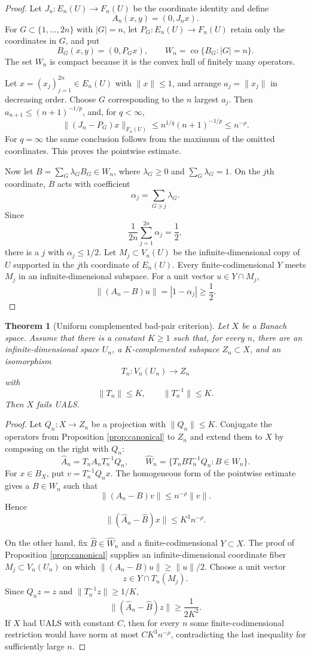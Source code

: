 \documentclass[11pt]{article}
\newtheorem{theorem}{Theorem}[section]
\theoremstyle{definition}
\theoremstyle{remark}
\newcommand{\co}{\operatorname{co}}
\begin{document}
\begin{proof}
Let $J_n:E_n(U)\to F_n(U)$ be the coordinate identity and define
\[
  A_n(x,y)=(0,J_nx).
\]
For $G\subset\{1,\dots,2n\}$ with $|G|=n$, let $P_G:E_n(U)\to F_n(U)$ retain only the coordinates in $G$, and put
\[
  B_G(x,y)=(0,P_Gx),
  \qquad
  W_n=\co\{B_G:|G|=n\}.
\]
The set $W_n$ is compact because it is the convex hull of finitely many operators.

Let $x=(x_j)_{j=1}^{2n}\in E_n(U)$ with $\|x\|\leq1$, and arrange $a_j=\|x_j\|$ in decreasing order.  Choose $G$ corresponding to the $n$ largest $a_j$.  Then $a_{n+1}\leq(n+1)^{-1/p}$, and, for $q<\infty$,
\[
  \|(J_n-P_G)x\|_{F_n(U)}
  \leq n^{1/q}(n+1)^{-1/p}
  \leq n^{-\rho}.
\]
For $q=\infty$ the same conclusion follows from the maximum of the omitted coordinates.  This proves the pointwise estimate.

Now let $B=\sum_G\lambda_GB_G\in W_n$, where $\lambda_G\geq0$ and $\sum_G\lambda_G=1$.  On the $j$th coordinate, $B$ acts with coefficient
\[
  \alpha_j=\sum_{G\ni j}\lambda_G.
\]
Since
\[
  \frac1{2n}\sum_{j=1}^{2n}\alpha_j=\frac12,
\]
there is a $j$ with $\alpha_j\leq1/2$.  Let $M_j\subset V_n(U)$ be the infinite-dimensional copy of $U$ supported in the $j$th coordinate of $E_n(U)$.  Every finite-codimensional $Y$ meets $M_j$ in an infinite-dimensional subspace.  For a unit vector $u\in Y\cap M_j$,
\[
  \|(A_n-B)u\|=|1-\alpha_j|\geq\frac12.
\]
\end{proof}

\begin{theorem}[Uniform complemented bad-pair criterion]\label{thm:badpair}
Let $X$ be a Banach space.  Assume that there is a constant $K\geq1$ such that, for every $n$, there are an infinite-dimensional space $U_n$, a $K$-complemented subspace $Z_n\subset X$, and an isomorphism
\[
  T_n:V_n(U_n)\longrightarrow Z_n
\]
with
\[
  \|T_n\|\leq K,
  \qquad
  \|T_n^{-1}\|\leq K.
\]
Then $X$ fails UALS.
\end{theorem}

\begin{proof}
Let $Q_n:X\to Z_n$ be a projection with $\|Q_n\|\leq K$.  Conjugate the operators from Proposition \ref{prop:canonical} to $Z_n$ and extend them to $X$ by composing on the right with $Q_n$:
\[
  \widehat A_n=T_nA_nT_n^{-1}Q_n,
  \qquad
  \widehat W_n=
  \{T_nBT_n^{-1}Q_n:B\in W_n\}.
\]
For $x\in B_X$, put $v=T_n^{-1}Q_nx$.  The homogeneous form of the pointwise estimate gives a $B\in W_n$ such that
\[
  \|(A_n-B)v\|\leq n^{-\rho}\|v\|.
\]
Hence
\[
  \|(\widehat A_n-\widehat B)x\|
  \leq K^3n^{-\rho}.
\]

On the other hand, fix $\widehat B\in\widehat W_n$ and a finite-codimensional $Y\subset X$.  The proof of Proposition \ref{prop:canonical} supplies an infinite-dimensional coordinate fiber $M_j\subset V_n(U_n)$ on which $\|(A_n-B)u\|\geq\|u\|/2$.  Choose a unit vector
\[
  z\in Y\cap T_n(M_j).
\]
Since $Q_nz=z$ and $\|T_n^{-1}z\|\geq1/K$,
\[
  \|(\widehat A_n-\widehat B)z\|
  \geq \frac{1}{2K^2}.
\]
If $X$ had UALS with constant $C$, then for every $n$ some finite-codimensional restriction would have norm at most $CK^3n^{-\rho}$, contradicting the last inequality for sufficiently large $n$.
\end{proof}
\end{document}
